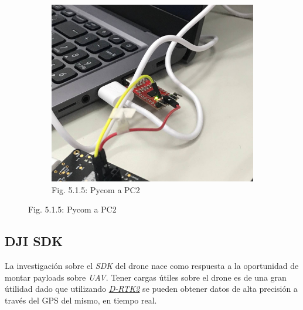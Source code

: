 \documentclass[12pt]{article}
\begin{document}
\begin{figure}[ht]
\begin{subfigure}[c]{0.45\linewidth}
    \includegraphics[width=\linewidth]{images/SMT32-PyCom-3.png}
    \caption{Fig. 5.1.5: Pycom a PC2}
  \end{subfigure}
\end{figure}
\FloatBarrier
\subsection{DJI SDK}
La investigación sobre el \textit{SDK} del drone nace como respuesta a la oportunidad de montar payloads sobre \textit{UAV}. Tener cargas útiles sobre el drone es de una gran útilidad dado que utilizando \href{https://www.dji.com/d-rtk-2}{\textit{D-RTK2}} \cite{rtk} se pueden obtener datos de alta precisión a través del GPS del mismo, en tiempo real.
\end{document}
